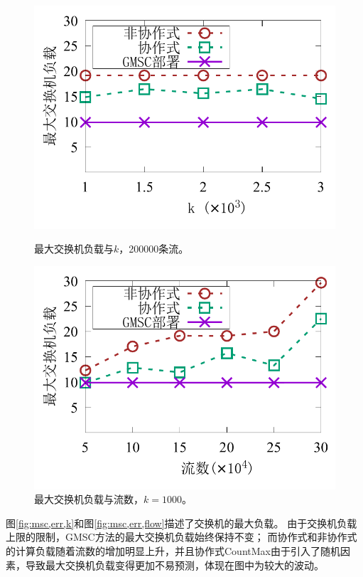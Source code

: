 \begin{figure}[ht]
	\centering
	\begin{minipage}[t]{0.48\linewidth}		
		\centering
		\includegraphics[width=\linewidth]{fig/msc_k_time.pdf}
		\caption{\textnormal{最大交换机负载与$k$，200000条流。}}
		\label{fig:msc,time,k}
	\end{minipage}\vspace{-0.6em}\hspace{0.4em}
	\begin{minipage}[t]{0.48\linewidth}
		\centering
		\includegraphics[width=\linewidth]{fig/msc_f_time.pdf}
		\caption{\textnormal{最大交换机负载与流数，$k=1000$。}}
		\label{fig:msc,time,flow}
	\end{minipage}\vspace{-0.6em}
\end{figure}

图\ref{fig:msc,err,k}和图\ref{fig:msc,err,flow}描述了交换机的最大负载。
由于交换机负载上限的限制，GMSC方法的最大交换机负载始终保持不变；
而协作式和非协作式的计算负载随着流数的增加明显上升，并且协作式CountMax由于引入了随机因素，导致最大交换机负载变得更加不易预测，体现在图中为较大的波动。

